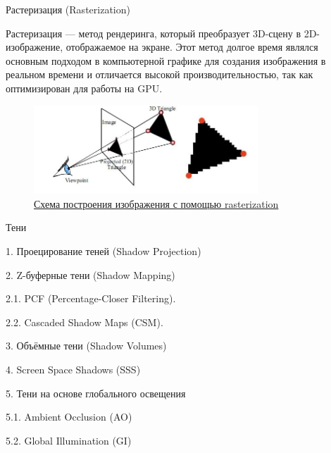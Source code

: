 \documentclass{beamer}
\begin{document}
	\begin{frame}{Растеризация (Rasterization)}
	
		Растеризация --- метод рендеринга, который преобразует 3D-сцену в 2D-изображение, отображаемое на экране. 
		Этот метод долгое время являлся основным подходом в компьютерной графике для создания изображения в реальном времени 
		и отличается высокой производительностью, так как оптимизирован для работы на GPU.

		\begin{figure}
			\includegraphics[width=0.75\textwidth]{images/rasterization.jpg}
			\caption{
				\href{https://racketboy.com/retro/about-video-games-rasterization-and-z-buffer}{Схема построения изображения с помощью rasterization}
			}
		\end{figure}


	\end{frame}

	\begin{frame}{Тени}

		1. Проецирование теней (Shadow Projection)

		2. Z-буферные тени (Shadow Mapping)

		2.1.	PCF (Percentage-Closer Filtering).%
			
		2.2.	Cascaded Shadow Maps (CSM). %

		3. Объёмные тени (Shadow Volumes)

		4. Screen Space Shadows (SSS)

		5. Тени на основе глобального освещения

		5.1.	Ambient Occlusion (AO)%

		5.2.	Global Illumination (GI)%
		
	\end{frame}
\end{document}
